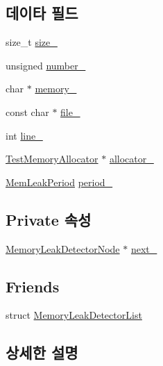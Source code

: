 \subsection*{데이타 필드}
\begin{DoxyCompactItemize}
\item 
size\+\_\+t \hyperlink{struct_memory_leak_detector_node_a5f31775800bbb46b35b5791def1f3acc}{size\+\_\+}
\item 
unsigned \hyperlink{struct_memory_leak_detector_node_aa14f02a32a8cc537af13ce5397fcd2b1}{number\+\_\+}
\item 
char $\ast$ \hyperlink{struct_memory_leak_detector_node_a6cdb5ad30702010eaf86e4e5f26defce}{memory\+\_\+}
\item 
const char $\ast$ \hyperlink{struct_memory_leak_detector_node_a1f340748cdde8f8781fa62b4a3562190}{file\+\_\+}
\item 
int \hyperlink{struct_memory_leak_detector_node_ac515e5f5602db49593f96316f1b5c054}{line\+\_\+}
\item 
\hyperlink{class_test_memory_allocator}{Test\+Memory\+Allocator} $\ast$ \hyperlink{struct_memory_leak_detector_node_a12122107c5adfce5f08568d080ad411a}{allocator\+\_\+}
\item 
\hyperlink{_memory_leak_detector_8h_ab248e6cc6c6699b88b002286d8a3ed76}{Mem\+Leak\+Period} \hyperlink{struct_memory_leak_detector_node_a4b296dc99cd64623a83ce9027f70e0e7}{period\+\_\+}
\end{DoxyCompactItemize}
\subsection*{Private 속성}
\begin{DoxyCompactItemize}
\item 
\hyperlink{struct_memory_leak_detector_node}{Memory\+Leak\+Detector\+Node} $\ast$ \hyperlink{struct_memory_leak_detector_node_a6a718fbf408f23d29c6ef9167005968c}{next\+\_\+}
\end{DoxyCompactItemize}
\subsection*{Friends}
\begin{DoxyCompactItemize}
\item 
struct \hyperlink{struct_memory_leak_detector_node_afbddc710b54bb177a15bbdecd145555d}{Memory\+Leak\+Detector\+List}
\end{DoxyCompactItemize}


\subsection{상세한 설명}


